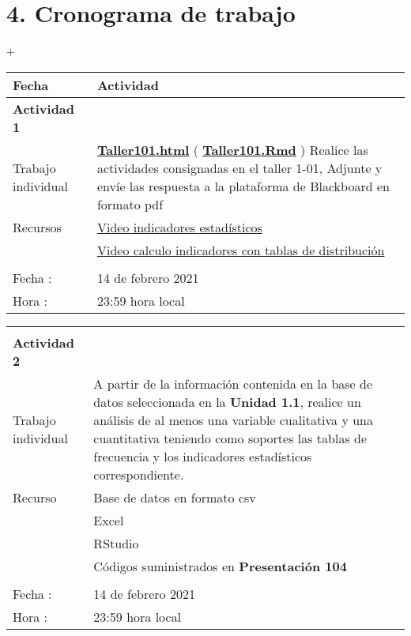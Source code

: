 \documentclass[base=hide,11pt]{elegantbook}
\begin{document}
\section*{4. Cronograma de trabajo}+ 
\begin{tabular}{p{4cm}p{10cm}}
\hline	
Fecha                   & Actividad	\\
\hline 	
{\bf Actividad 1}       &\\
Trabajo individual      & 
\href{https://dgonzalez80.github.io/index.html}{\bf Taller101.html} ( \href{https://javerianacaliedu-my.sharepoint.com/:u:/g/personal/dgonzalez_javerianacali_edu_co/ESnBpW2t9QxMu-pHe3M4_xoBs_qAIm2bsF6_4fBeqZZW8g?e=hjuTdn}{\textcolor{col3}{\bf Taller101.Rmd}} ) Realice las  actividades consignadas en  el taller 1-01, Adjunte y envíe las respuesta a la plataforma de Blackboard en  formato pdf\\
Recursos                 & \href{https://www.youtube.com/watch?v=dWVs-M7oCh4&t=24s}{ Video indicadores estadísticos}\\  
&\href{https://www.youtube.com/watch?v=n2UCDZNncls}{Video calculo indicadores con tablas de distribución} \\

&\\
Fecha  : & 14 de febrero 2021\\
Hora   : & 23:59 hora local \\
\hline 
\end{tabular}
\begin{tabular}{p{4cm}p{10cm}}
&\\ 
{\bf Actividad 2}  & \\
Trabajo individual &  A partir de la  información contenida en  la base de datos  seleccionada en la {\bf Unidad 1.1}, realice un análisis de al menos una variable cualitativa y una cuantitativa teniendo como soportes las tablas de frecuencia y los indicadores estadísticos correspondiente. \\
Recurso &  Base de datos en formato csv \\
        &  Excel \\
        &  RStudio \\
        & Códigos suministrados en  {\bf Presentación 104}\\
&\\
Fecha  : & 14 de febrero 2021\\
Hora   : & 23:59 hora local \\
\hline
\end{tabular}
\end{document}
